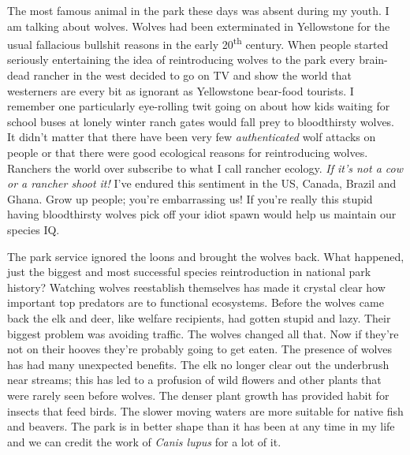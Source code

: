 The most famous animal in the park these days was absent during my
youth. I am talking about wolves. Wolves had been exterminated in
Yellowstone for the usual fallacious bullshit reasons in the early
20\textsuperscript{th} century. When people started seriously
entertaining the idea of reintroducing wolves to the park every
brain-dead rancher in the west decided to go on TV and show the world
that westerners are every bit as ignorant as Yellowstone bear-food
tourists. I remember one particularly eye-rolling twit going on about
how kids waiting for school buses at lonely winter ranch gates would
fall prey to bloodthirsty wolves. It didn't matter that there have been
very few \emph{authenticated} wolf attacks on people or that there were
good ecological reasons for reintroducing wolves. Ranchers the world
over subscribe to what I call rancher ecology. \emph{If it's not a cow
or a rancher shoot it!} I've endured this sentiment in the US, Canada,
Brazil and Ghana. Grow up people; you're embarrassing us! If you're
really this stupid having bloodthirsty wolves pick off your idiot spawn
would help us maintain our species IQ.

The park service ignored the loons and brought the wolves back. What
happened, just the biggest and most successful species reintroduction in
national park history? Watching wolves reestablish themselves has made
it crystal clear how important top predators are to functional
ecosystems. Before the wolves came back the elk and deer, like welfare
recipients, had gotten stupid and lazy. Their biggest problem was
avoiding traffic. The wolves changed all that. Now if they're not on
their hooves they're probably going to get eaten. The presence of wolves
has had many unexpected benefits. The elk no longer clear out the
underbrush near streams; this has led to a profusion of wild flowers and
other plants that were rarely seen before wolves. The denser plant
growth has provided habit for insects that feed birds. The slower moving
waters are more suitable for native fish and beavers. The park is in
better shape than it has been at any time in my life and we can credit
the work of \emph{Canis lupus} for a lot of it.



